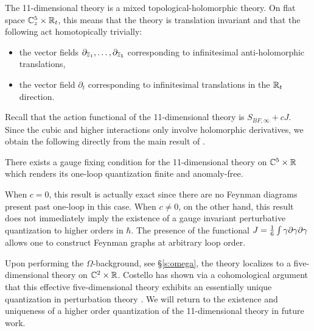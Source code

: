 The 11-dimensional theory is a mixed topological-holomorphic theory.
On flat space $\mathbb C^5_z \times \mathbb R_t$, this means that the theory is translation invariant and that the following act homotopically trivially:
\begin{itemize}
\item the vector fields $\partial_{\overline{z}_1}, \ldots, \partial_{\overline{z}_{5}}$ corresponding to infinitesimal anti-holomorphic translations,
\item the vector field $\partial_t$ corresponding to infinitesimal translations in the $\mathbb R_t$ direction. 
\end{itemize}

Recall that the action functional of the 11-dimensional theory is $S_{BF, \infty} + c J$. 
Since the cubic and higher interactions only involve holomorphic derivatives, we obtain the following directly from the main result of \cite{GRWthf}. 

\begin{thm}
There exists a gauge fixing condition for the 11-dimensional theory on $\mathbb C^5 \times \mathbb R$ which renders its one-loop quantization finite and anomaly-free. 
\end{thm} 

When $c=0$, this result is actually exact
since there are no Feynman diagrams present past one-loop in this case. 
When $c \ne 0$, on the other hand, this result does not immediately imply the existence of a gauge invariant perturbative quantization to higher orders in $\hbar$. 
The presence of the functional $J = \frac16 \int \gamma \partial \gamma \partial \gamma$ allows one to construct Feynman graphs at arbitrary loop order. 

Upon performing the $\Omega$-background, see \S \ref{s:omega}, the theory localizes to a five-dimensional theory on $\mathbb C^2 \times \mathbb R$. 
Costello has shown via a cohomological argument that this effective five-dimensional theory exhibits an essentially unique quantization in perturbation theory \cite{CostelloM5}. 
We will return to the existence and uniqueness of a higher order quantization of the 11-dimensional theory in future work. 
